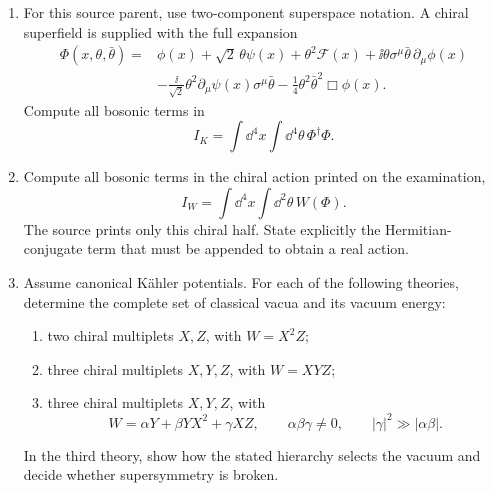 \begin{enumerate}
\begin{enumerate}
    \item[(b)] For this source parent, use two-component superspace notation.
    A chiral superfield is supplied with the full expansion
    \[
      \begin{aligned}
        \Phi(x,\theta,\bar\theta)={}&
          \phi(x)+\sqrt2\,\theta\psi(x)+\theta^2\mathcal F(x)
          +\ii\theta\sigma^\mu\bar\theta\,\partial_\mu\phi(x)\\
          &-\frac{\ii}{\sqrt2}\theta^2
            \partial_\mu\psi(x)\sigma^\mu\bar\theta
          -\frac14\theta^2\bar\theta^2\Box\phi(x).
      \end{aligned}
    \]
    Compute all bosonic terms in
    \[
      I_K=\int \dd^4x\int \dd^4\theta\,\Phi^\dagger\Phi .
    \]

    \item[(c)] Compute all bosonic terms in the chiral action printed on the
    examination,
    \[
      I_W=\int \dd^4x\int \dd^2\theta\,W(\Phi).
    \]
    The source prints only this chiral half.  State explicitly the
    Hermitian-conjugate term that must be appended to obtain a real action.

    \item[(d)] Assume canonical K\"ahler potentials.  For each of the
    following theories, determine the complete set of classical vacua and
    its vacuum energy:
    \begin{enumerate}
      \item[(i)] two chiral multiplets \(X,Z\), with
      \(W=X^2Z\);
      \item[(ii)] three chiral multiplets \(X,Y,Z\), with
      \(W=XYZ\);
      \item[(iii)] three chiral multiplets \(X,Y,Z\), with
      \[
        W=\alpha Y+\beta YX^2+\gamma XZ,
        \qquad
        \alpha\beta\gamma\ne0,
        \qquad
        |\gamma|^2\gg|\alpha\beta|.
      \]
    \end{enumerate}
    In the third theory, show how the stated hierarchy selects the vacuum
    and decide whether supersymmetry is broken.
  \end{enumerate}

\end{enumerate}

